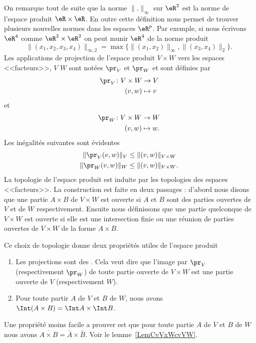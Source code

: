 On remarque tout de suite que la norme $\|.\|_\infty$ sur $\eR^2$ est la norme de l'espace produit $\eR\times\eR$. En outre cette définition nous permet de trouver plusieurs nouvelles normes dans les espaces $\eR^p$. Par exemple, si nous écrivons $\eR^4$ comme $\eR^2\times \eR^2$ on peut munir $\eR^4$ de la norme produit
\[
\|(x_1,x_2,x_3,x_4)\|_{\infty, 2}=\max\{\|(x_1,x_2)\|_\infty, \|(x_3,x_4)\|_2\}.
\]
Les applications de projection de l'espace produit $V\times W$ vers les espaces <<facteurs>>, $V$ $W$ sont notées $\pr_V$ et $\pr_W$ et sont définies par
\begin{equation}
	\begin{aligned}
		\pr_V\colon V\times W&\to V \\
		(v,w)&\mapsto v
	\end{aligned}
\end{equation}
et
\begin{equation}
	\begin{aligned}
		\pr_W\colon V\times W &\to W \\
		(v,w)&\mapsto w.
	\end{aligned}
\end{equation}
Les inégalités suivantes sont évidentes
\begin{equation}
	\begin{aligned}[]
		\|\pr_V(v,w)\|_V&\leq \|(v,w)\|_{V\times W} \\
		\|\pr_W(v,w)\|_W&\leq \|(v,w)\|_{V\times W}.
	\end{aligned}
\end{equation}
La topologie de l'espace produit est induite par les topologies des espaces <<facteurs>>. La construction est faite en deux passages : d'abord nous disons que une partie $A\times B$ de $V\times W$ est ouverte si $A$ et $B$ sont des parties ouvertes de $V$ et de $W$ respectivement.  Ensuite nous définissons que une partie quelconque de $V\times W$ est ouverte si elle est une intersection finie ou une réunion de parties ouvertes de $V\times W$ de la forme $A\times B$.

Ce choix de topologie donne deux propriétés utiles de l'espace produit
\begin{enumerate}
	\item
		Les projections sont des . Cela veut dire que l'image par $\pr_V$ (respectivement $\pr_W$) de toute partie ouverte de $V\times W$ est une partie ouverte de $V$ (respectivement $W$).
	\item
		Pour toute partir $A$ de $V$ et $B$ de $W$, nous avons $\Int (A\times B)=\Int A\times \Int B$.\label{PgovlABeqbAbB}
\end{enumerate}
Une propriété moins facile a prouver est que pour toute partie $A$ de $V$ et $B$ de $W$ nous avons  $\overline{A\times B}=\bar{A}\times \bar{B}$. Voir le lemme~\ref{LemCvVxWcvVW}.

